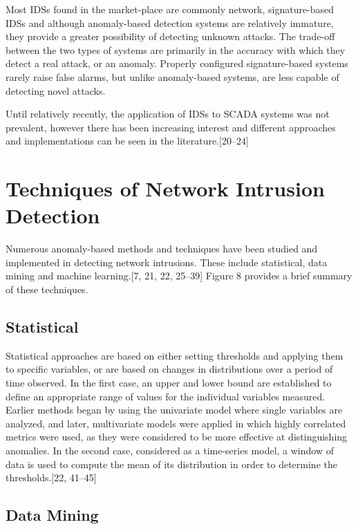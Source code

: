 \documentclass[11pt,a4paper]{article}
\begin{document}
Most IDSs found in the market-place are commonly network,
signature-based IDSs and although anomaly-based detection systems are
relatively immature, they provide a greater possibility of detecting
unknown attacks. The trade-off between the two types of systems are
primarily in the accuracy with which they detect a real attack, or an
anomaly. Properly configured signature-based systems rarely raise false
alarms, but unlike anomaly-based systems, are less capable of detecting
novel attacks.

Until relatively recently, the application of IDSs to SCADA systems was
not prevalent, however there has been increasing interest and different
approaches and implementations can be seen in the
literature.{[}20--24{]}

\newpage

\section{Techniques of Network Intrusion
Detection}\label{techniques-of-network-intrusion-detection}

Numerous anomaly-based methods and techniques have been studied and
implemented in detecting network intrusions. These include statistical,
data mining and machine learning.{[}7, 21, 22, 25--39{]} Figure 8
provides a brief summary of these techniques.

\subsection{Statistical}\label{statistical}

Statistical approaches are based on either setting thresholds and
applying them to specific variables, or are based on changes in
distributions over a period of time observed. In the first case, an
upper and lower bound are established to define an appropriate range of
values for the individual variables measured. Earlier methods began by
using the univariate model where single variables are analyzed, and
later, multivariate models were applied in which highly correlated
metrics were used, as they were considered to be more effective at
distinguishing anomalies. In the second case, considered as a
time-series model, a window of data is used to compute the mean of its
distribution in order to determine the thresholds.{[}22, 41--45{]}

\subsection{Data Mining}\label{data-mining}
\end{document}
